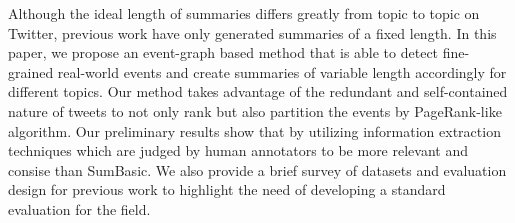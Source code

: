 Although the ideal length of summaries differs greatly from topic to topic on Twitter, previous work have only generated summaries of a fixed length. In this
 paper, we propose an event-graph based method that is able to detect
 fine-grained real-world events and create summaries of variable length
 accordingly for different topics. Our method takes advantage of the redundant
 and self-contained nature of tweets to not only rank but also partition the
 events by PageRank-like algorithm. Our preliminary results show that by
 utilizing information extraction techniques which are judged by human
 annotators to be more relevant and consise than SumBasic. We also provide a
 brief survey of datasets and evaluation design
 for previous work to highlight the need of developing a standard evaluation for
 the field.

